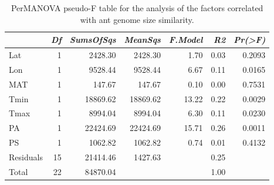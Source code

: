 \begin{table}[ht]
\centering
\begin{tabular}{lrrrrrr}
  \hline
 & {\emph{Df}} & {\emph{SumsOfSqs}} & {\emph{MeanSqs}} & {\emph{F.Model}} & {\emph{R2}} & {\emph{Pr(>F)}} \\ 
  \hline
Lat & 1 & 2428.30 & 2428.30 & 1.70 & 0.03 & 0.2093 \\ 
  Lon & 1 & 9528.44 & 9528.44 & 6.67 & 0.11 & 0.0165 \\ 
  MAT & 1 & 147.67 & 147.67 & 0.10 & 0.00 & 0.7531 \\ 
  Tmin & 1 & 18869.62 & 18869.62 & 13.22 & 0.22 & 0.0029 \\ 
  Tmax & 1 & 8994.04 & 8994.04 & 6.30 & 0.11 & 0.0230 \\ 
  PA & 1 & 22424.69 & 22424.69 & 15.71 & 0.26 & 0.0011 \\ 
  PS & 1 & 1062.82 & 1062.82 & 0.74 & 0.01 & 0.4132 \\ 
  Residuals & 15 & 21414.46 & 1427.63 &  & 0.25 &  \\ 
  Total & 22 & 84870.04 &  &  & 1.00 &  \\ 
   \hline
\end{tabular}
\caption{PerMANOVA pseudo-F table for the analysis of the factors 
correlated with ant genome size similarity.} 
\label{tab:perm_size}
\end{table}
